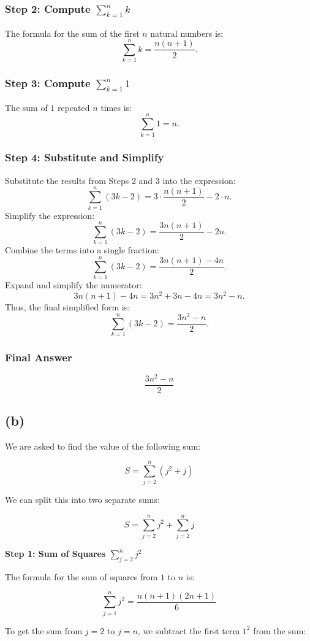 \documentclass{article}
\begin{document}
\subsubsection*{Step 2: Compute \(\sum_{k=1}^{n} k\)}
The formula for the sum of the first \(n\) natural numbers is:
\[
\sum_{k=1}^{n} k = \frac{n(n+1)}{2}.
\]

\subsubsection*{Step 3: Compute \(\sum_{k=1}^{n} 1\)}
The sum of \(1\) repeated \(n\) times is:
\[
\sum_{k=1}^{n} 1 = n.
\]

\subsubsection*{Step 4: Substitute and Simplify}
Substitute the results from Steps 2 and 3 into the expression:
\[
\sum_{k=1}^{n} (3k - 2) = 3 \cdot \frac{n(n+1)}{2} - 2 \cdot n.
\]
Simplify the expression:
\[
\sum_{k=1}^{n} (3k - 2) = \frac{3n(n+1)}{2} - 2n.
\]
Combine the terms into a single fraction:
\[
\sum_{k=1}^{n} (3k - 2) = \frac{3n(n+1) - 4n}{2}.
\]
Expand and simplify the numerator:
\[
3n(n+1) - 4n = 3n^2 + 3n - 4n = 3n^2 - n.
\]
Thus, the final simplified form is:
\[
\sum_{k=1}^{n} (3k - 2) = \frac{3n^2 - n}{2}.
\]

\subsubsection*{Final Answer}
\[
\boxed{\frac{3n^2 - n}{2}}
\]
\subsection*{(b)}

We are asked to find the value of the following sum:

\[
S = \sum_{j=2}^n (j^2 + j)
\]

We can split this into two separate sums:

\[
S = \sum_{j=2}^n j^2 + \sum_{j=2}^n j
\]

\textbf{Step 1: Sum of Squares \( \sum_{j=2}^n j^2 \)}

The formula for the sum of squares from \(1\) to \(n\) is:

\[
\sum_{j=1}^n j^2 = \frac{n(n+1)(2n+1)}{6}
\]

To get the sum from \(j = 2\) to \(j = n\), we subtract the first term \(1^2\) from the sum:
\end{document}
